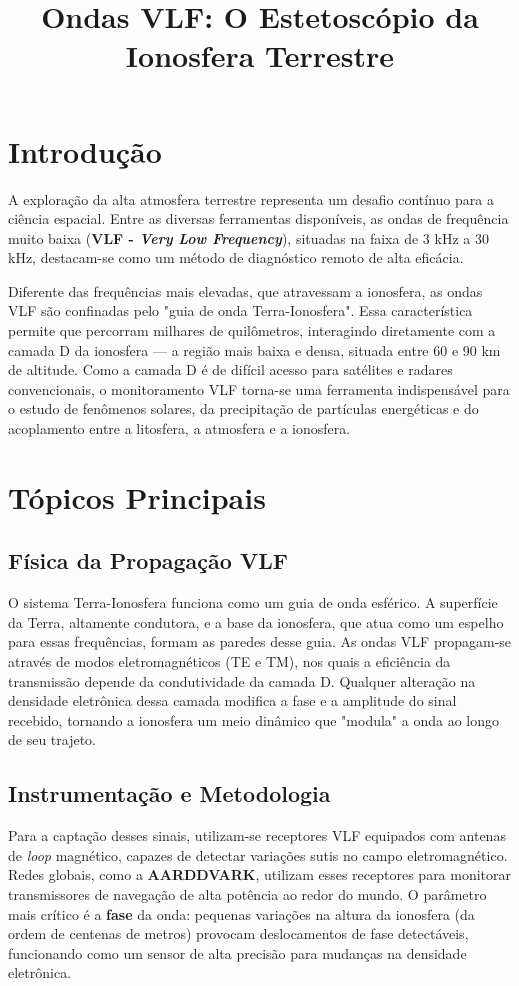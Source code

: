 \documentclass[12pt,a4paper]{article}
\title{Ondas VLF: O Estetoscópio da Ionosfera Terrestre}
\author{}
\date{}
\begin{document}
\maketitle

\section{Introdução}

A exploração da alta atmosfera terrestre representa um desafio contínuo para a ciência espacial. Entre as diversas ferramentas disponíveis, as ondas de frequência muito baixa (\textbf{VLF - \textit{Very Low Frequency}}), situadas na faixa de 3 kHz a 30 kHz, destacam-se como um método de diagnóstico remoto de alta eficácia.

Diferente das frequências mais elevadas, que atravessam a ionosfera, as ondas VLF são confinadas pelo "guia de onda Terra-Ionosfera". Essa característica permite que percorram milhares de quilômetros, interagindo diretamente com a camada D da ionosfera --- a região mais baixa e densa, situada entre 60 e 90 km de altitude. Como a camada D é de difícil acesso para satélites e radares convencionais, o monitoramento VLF torna-se uma ferramenta indispensável para o estudo de fenômenos solares, da precipitação de partículas energéticas e do acoplamento entre a litosfera, a atmosfera e a ionosfera.

\section{Tópicos Principais}

\subsection{Física da Propagação VLF}
O sistema Terra-Ionosfera funciona como um guia de onda esférico. A superfície da Terra, altamente condutora, e a base da ionosfera, que atua como um espelho para essas frequências, formam as paredes desse guia. As ondas VLF propagam-se através de modos eletromagnéticos (TE e TM), nos quais a eficiência da transmissão depende da condutividade da camada D. Qualquer alteração na densidade eletrônica dessa camada modifica a fase e a amplitude do sinal recebido, tornando a ionosfera um meio dinâmico que "modula" a onda ao longo de seu trajeto.

\subsection{Instrumentação e Metodologia}
Para a captação desses sinais, utilizam-se receptores VLF equipados com antenas de \textit{loop} magnético, capazes de detectar variações sutis no campo eletromagnético. Redes globais, como a \textbf{AARDDVARK}, utilizam esses receptores para monitorar transmissores de navegação de alta potência ao redor do mundo. O parâmetro mais crítico é a \textbf{fase} da onda: pequenas variações na altura da ionosfera (da ordem de centenas de metros) provocam deslocamentos de fase detectáveis, funcionando como um sensor de alta precisão para mudanças na densidade eletrônica.
\end{document}

